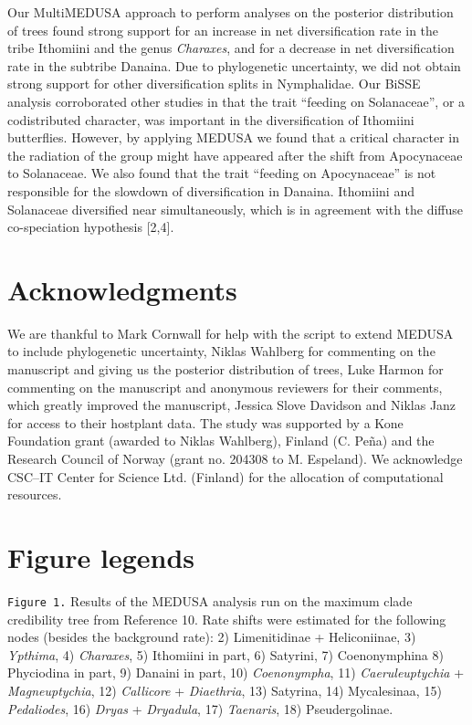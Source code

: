 \documentclass[10pt]{article}
\begin{document}
Our MultiMEDUSA approach to perform analyses on the posterior
distribution of trees found strong support for an increase in net
diversification rate in the tribe Ithomiini and the genus
\emph{Charaxes}, and for a decrease in net diversification rate in the
subtribe Danaina. Due to phylogenetic uncertainty, we did not obtain
strong support for other diversification splits in Nymphalidae. Our
BiSSE analysis corroborated other studies in that the trait ``feeding on
Solanaceae'', or a codistributed character, was important in the
diversification of Ithomiini butterflies. However, by applying MEDUSA we
found that a critical character in the radiation of the group might have
appeared after the shift from Apocynaceae to Solanaceae. We also found
that the trait ``feeding on Apocynaceae'' is not responsible for the
slowdown of diversification in Danaina. Ithomiini and Solanaceae
diversified near simultaneously, which is in agreement with the diffuse
co-speciation hypothesis {[}2,4{]}.

\section*{Acknowledgments}

We are thankful to Mark Cornwall for help with the script to extend
MEDUSA to include phylogenetic uncertainty, Niklas Wahlberg for
commenting on the manuscript and giving us the posterior distribution of
trees, Luke Harmon for commenting on the manuscript and anonymous
reviewers for their comments, which greatly improved the manuscript,
Jessica Slove Davidson and Niklas Janz for access to their hostplant
data. The study was supported by a Kone Foundation grant (awarded to
Niklas Wahlberg), Finland (C. Peña) and the Research Council of Norway
(grant no. 204308 to M. Espeland). We acknowledge CSC--IT Center for
Science Ltd. (Finland) for the allocation of computational resources.

\section*{Figure legends}

\texttt{Figure 1.} Results of the MEDUSA analysis run on the maximum
clade credibility tree from Reference 10. Rate shifts were estimated for
the following nodes (besides the background rate): 2) Limenitidinae +
Heliconiinae, 3) \emph{Ypthima}, 4) \emph{Charaxes}, 5) Ithomiini in
part, 6) Satyrini, 7) Coenonymphina 8) Phyciodina in part, 9) Danaini in
part, 10) \emph{Coenonympha}, 11) \emph{Caeruleuptychia} +
\emph{Magneuptychia}, 12) \emph{Callicore} + \emph{Diaethria}, 13)
Satyrina, 14) Mycalesinaa, 15) \emph{Pedaliodes}, 16) \emph{Dryas} +
\emph{Dryadula}, 17) \emph{Taenaris}, 18) Pseudergolinae.
\end{document}

